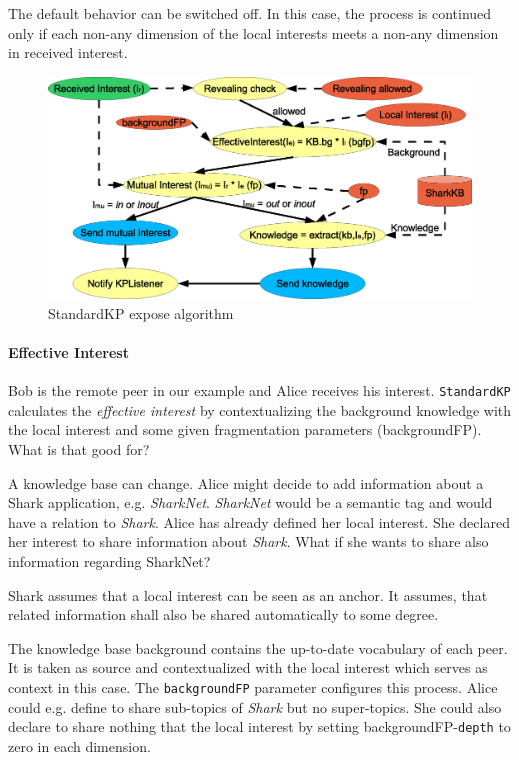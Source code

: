 {The default behavior can be switched off. In this case, the process is continued only if each non-any dimension of the local interests meets a non-any dimension in received interest.

\begin{figure}[t]
\centering
\includegraphics[width=1.00\textwidth]{StandardKP_Expose.eps}
\caption{StandardKP expose algorithm}
\label{fig:StandardKP_expose}
\end{figure}

\paragraph{Effective Interest}
Bob is the remote peer in our example and Alice receives his interest. {\tt StandardKP} calculates the {\it effective interest} by contextualizing the background knowledge with the local interest and some given fragmentation parameters (backgroundFP). What is that good for?

A knowledge base can change. Alice might decide to add information about a Shark application, e.g. {\it SharkNet}. {\it SharkNet} would be a semantic tag and would have a relation to {\it Shark}. Alice has already defined her local interest. She declared her interest to share information about {\it Shark}. What if she wants to share also information regarding SharkNet?

Shark assumes that a local interest can be seen as an anchor. It assumes, that related information shall also be shared automatically to some degree.

The knowledge base background contains the up-to-date vocabulary of each peer. It is taken as source and contextualized with the local interest which serves as context in this case. The {\tt backgroundFP} parameter configures this process. Alice could e.g. define to share sub-topics of {\it Shark} but no super-topics. She could also declare to share nothing that the local interest by setting backgroundFP-{\tt depth} to zero in each dimension.

}
